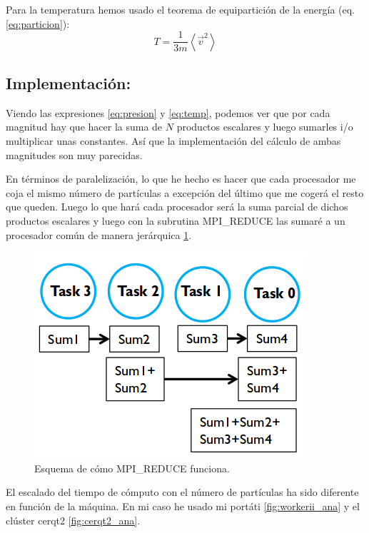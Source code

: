 Para la temperatura hemos usado el teorema de equipartición de la energía (eq. \ref{eq:particion}):
\begin{equation}
T = \frac{1}{3m} \left\langle \vec{v}^2 \right\rangle
\label{eq:temp}
\end{equation}

\subsection{Implementación:}
Viendo las expresiones \ref{eq:presion} y \ref{eq:temp}, podemos ver que por cada magnitud hay que hacer la suma de $N$ productos escalares y luego sumarles i/o multiplicar unas constantes. Así que la implementación del cálculo de ambas magnitudes son muy parecidas.

En términos de paralelización, lo que he hecho es hacer que cada procesador me coja el mismo número de partículas a excepción del último que me cogerá el resto que queden. Luego lo que hará cada procesador será la suma parcial de dichos productos escalares y luego con la subrutina \textsf{MPI\_REDUCE} las sumaré a un procesador común de manera jerárquica \ref{fig:reduce}.
\begin{figure}[H]
\includegraphics[scale=0.50]{reduce.png} 
\caption{Esquema de cómo \textsf{MPI\_REDUCE} funciona.} 
\label{fig:reduce}
\end{figure}
El escalado del tiempo de cómputo con el número de partículas ha sido diferente en función de la máquina. En mi caso he usado mi portáti \ref{fig:workerii_ana} y el clúster cerqt2 \ref{fig:cerqt2_ana}.

